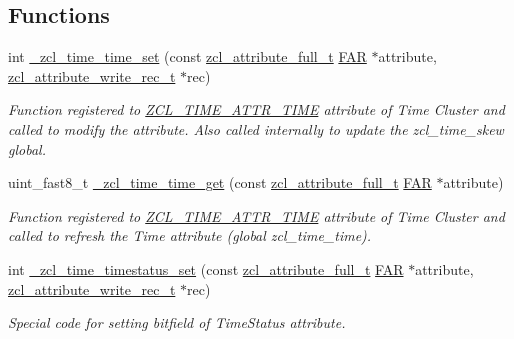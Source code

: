 \subsection*{Functions}
\begin{DoxyCompactItemize}
\item 
int \hyperlink{group__zcl__time_ga052b988d6d2448af6640028b45ee1f68}{\-\_\-zcl\-\_\-time\-\_\-time\-\_\-set} (const \hyperlink{structzcl__attribute__full__t}{zcl\-\_\-attribute\-\_\-full\-\_\-t} \hyperlink{group__hal_gaef060b3456fdcc093a7210a762d5f2ed}{F\-A\-R} $\ast$attribute, \hyperlink{structzcl__attribute__write__rec__t}{zcl\-\_\-attribute\-\_\-write\-\_\-rec\-\_\-t} $\ast$rec)
\begin{DoxyCompactList}\small\item\em Function registered to \hyperlink{group__zcl__time_ga6abf0e2cc70ac533ebe153a40185be63}{Z\-C\-L\-\_\-\-T\-I\-M\-E\-\_\-\-A\-T\-T\-R\-\_\-\-T\-I\-M\-E} attribute of Time Cluster and called to modify the attribute. Also called internally to update the zcl\-\_\-time\-\_\-skew global. \end{DoxyCompactList}\item 
uint\-\_\-fast8\-\_\-t \hyperlink{group__zcl__time_ga9c0749b71318a4f7fd28d9112ffd5462}{\-\_\-zcl\-\_\-time\-\_\-time\-\_\-get} (const \hyperlink{structzcl__attribute__full__t}{zcl\-\_\-attribute\-\_\-full\-\_\-t} \hyperlink{group__hal_gaef060b3456fdcc093a7210a762d5f2ed}{F\-A\-R} $\ast$attribute)
\begin{DoxyCompactList}\small\item\em Function registered to \hyperlink{group__zcl__time_ga6abf0e2cc70ac533ebe153a40185be63}{Z\-C\-L\-\_\-\-T\-I\-M\-E\-\_\-\-A\-T\-T\-R\-\_\-\-T\-I\-M\-E} attribute of Time Cluster and called to refresh the Time attribute (global zcl\-\_\-time\-\_\-time). \end{DoxyCompactList}\item 
int \hyperlink{group__zcl__time_ga1b55e2dc0a4e0752c92dda9b65d349d2}{\-\_\-zcl\-\_\-time\-\_\-timestatus\-\_\-set} (const \hyperlink{structzcl__attribute__full__t}{zcl\-\_\-attribute\-\_\-full\-\_\-t} \hyperlink{group__hal_gaef060b3456fdcc093a7210a762d5f2ed}{F\-A\-R} $\ast$attribute, \hyperlink{structzcl__attribute__write__rec__t}{zcl\-\_\-attribute\-\_\-write\-\_\-rec\-\_\-t} $\ast$rec)
\begin{DoxyCompactList}\small\item\em Special code for setting bitfield of Time\-Status attribute. \end{DoxyCompactList}\item 

\end{DoxyCompactItemize}

